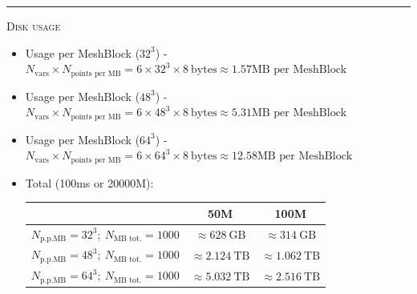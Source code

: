 \documentclass{article}
\newcommand{\step}[1]{%
  \par\medskip\noindent
  {\color{stepfg}\rule[-0.15ex]{2pt}{1.5ex}\hspace{0.5em}\scshape #1}%
  \hspace{0.75em}\ignorespaces}
\begin{document}
\step{Disk usage}
\begin{itemize}
  \item Usage per MeshBlock ($32^3$) - $N_{\mathrm{vars}}\times N_{\text{points per MB}}=6\times32^3\times 8\ \mathrm{bytes}\approx\boxed{1.57\text{MB per MeshBlock}}$
  \item Usage per MeshBlock ($48^3$) - $N_{\mathrm{vars}}\times N_{\text{points per MB}}=6\times48^3\times 8\ \mathrm{bytes}\approx\boxed{5.31\text{MB per MeshBlock}}$
  \item Usage per MeshBlock ($64^3$) - $N_{\mathrm{vars}}\times N_{\text{points per MB}}=6\times64^3\times 8\ \mathrm{bytes}\approx\boxed{12.58\text{MB per MeshBlock}}$
  \item Total (100ms or 20000M):
  \begin{raggedleft}
    \begin{tabular}{|c|c|c|}
      \hline
      &\textbf{50M}&\textbf{100M}\\
      \hline
      $N_{\text{p.p.MB}}=32^3;\ N_{\text{MB tot.}}=1000$&$\approx 628\ \mathrm{GB}$&$\approx 314\ \mathrm{GB}$\\
      \hline
      $N_{\text{p.p.MB}}=48^3;\ N_{\text{MB tot.}}=1000$&$\approx 2.124\ \mathrm{TB}$&$\approx 1.062\ \mathrm{TB}$\\
      \hline
      $N_{\text{p.p.MB}}=64^3;\ N_{\text{MB tot.}}=1000$&$\approx 5.032\ \mathrm{TB}$&$\approx 2.516\ \mathrm{TB}$\\
      \hline
    \end{tabular}
  \end{raggedleft}
\end{itemize}
\end{document}

